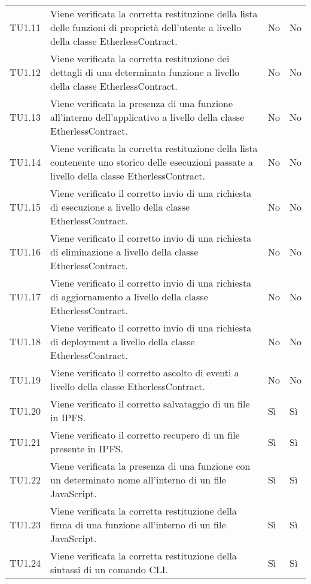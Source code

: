 \begin{longtable}{
		>{\centering}p{}
		>{}p{}
		>{\centering}p{}
		>{\centering}p{} }
		TU1.11 &
		Viene verificata la corretta restituzione della lista delle funzioni di proprietà dell’utente a livello della classe EtherlessContract. &
		No &
		No \tabularnewline

		TU1.12 &
		Viene verificata la corretta restituzione dei dettagli di una determinata funzione a livello della classe EtherlessContract. &
		No &
		No \tabularnewline

		TU1.13 &
		Viene verificata la presenza di una funzione all’interno dell’applicativo a livello della classe EtherlessContract. &
		No &
		No \tabularnewline

		TU1.14 &
		Viene verificata la corretta restituzione della lista contenente uno storico delle esecuzioni passate a livello della classe EtherlessContract. &
		No &
		No \tabularnewline

		TU1.15 &
		Viene verificato il corretto invio di una richiesta di esecuzione a livello della classe EtherlessContract. &
		No &
		No \tabularnewline

		TU1.16 &
		Viene verificato il corretto invio di una richiesta di eliminazione a livello della classe EtherlessContract. &
		No &
		No \tabularnewline

		TU1.17 &
		Viene verificato il corretto invio di una richiesta di aggiornamento a livello della classe EtherlessContract. &
		No &
		No \tabularnewline

		TU1.18 &
		Viene verificato il corretto invio di una richiesta di deployment\ped{\textit{G}} a livello della classe EtherlessContract. &
		No &
		No \tabularnewline

		TU1.19 &
		Viene verificato il corretto ascolto di eventi\ped{\textit{G}} a livello della classe EtherlessContract. &
		No &
		No \tabularnewline

		TU1.20 &
		Viene verificato il corretto salvataggio di un file in IPFS\ped{\textit{G}}. &
		Sì &
		Sì \tabularnewline

		TU1.21 &
		Viene verificato il corretto recupero di un file presente in IPFS\ped{\textit{G}}. &
		Sì &
		Sì \tabularnewline

		TU1.22 &
		Viene verificata la presenza di una funzione con un determinato nome all’interno di un file JavaScript\ped{\textit{G}}. &
		Sì &
		Sì \tabularnewline

		TU1.23 &
		Viene verificata la corretta restituzione della firma di una funzione all’interno di un file JavaScript\ped{\textit{G}}. &
		Sì &
		Sì \tabularnewline

		TU1.24 &
		Viene verificata la corretta restituzione della sintassi di un comando CLI\ped{\textit{G}}. &
		Sì &
		Sì \tabularnewline


\end{longtable}
